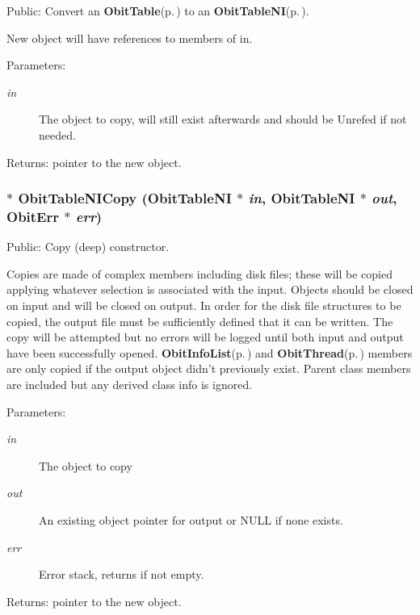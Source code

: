 Public: Convert an {\bf Obit\-Table}{\rm (p.\,\pageref{structObitTable})} to an {\bf Obit\-Table\-NI}{\rm (p.\,\pageref{structObitTableNI})}. 

New object will have references to members of in. \begin{Desc}
\item[Parameters:]
\begin{description}
\item[{\em in}]The object to copy, will still exist afterwards and should be Unrefed if not needed. \end{description}
\end{Desc}
\begin{Desc}
\item[Returns:]pointer to the new object. \end{Desc}
\subsubsection{$\ast$ Obit\-Table\-NICopy ({\bf Obit\-Table\-NI} $\ast$ {\em in}, {\bf Obit\-Table\-NI} $\ast$ {\em out}, {\bf Obit\-Err} $\ast$ {\em err})}\label{ObitTableNI_8h_a14}


Public: Copy (deep) constructor. 

Copies are made of complex members including disk files; these will be copied applying whatever selection is associated with the input. Objects should be closed on input and will be closed on output. In order for the disk file structures to be copied, the output file must be sufficiently defined that it can be written. The copy will be attempted but no errors will be logged until both input and output have been successfully opened. {\bf Obit\-Info\-List}{\rm (p.\,\pageref{structObitInfoList})} and {\bf Obit\-Thread}{\rm (p.\,\pageref{structObitThread})} members are only copied if the output object didn't previously exist. Parent class members are included but any derived class info is ignored. \begin{Desc}
\item[Parameters:]
\begin{description}
\item[{\em in}]The object to copy \item[{\em out}]An existing object pointer for output or NULL if none exists. \item[{\em err}]Error stack, returns if not empty. \end{description}
\end{Desc}
\begin{Desc}
\item[Returns:]pointer to the new object. \end{Desc}
